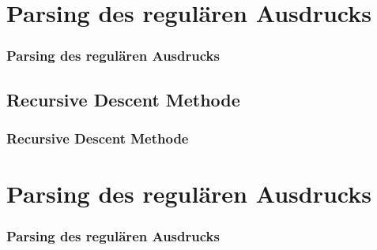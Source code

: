\documentclass[ignorenonframetext]{beamer}
\begin{document}
\section{Parsing des regulären Ausdrucks}

\begin{frame}
    \frametitle{Parsing des regulären Ausdrucks}

\end{frame}


\subsection{Recursive Descent Methode}
\begin{frame}
    \frametitle{Recursive Descent Methode}

\end{frame}



\section{Parsing des regulären Ausdrucks}

\begin{frame}
    \frametitle{Parsing des regulären Ausdrucks}

\end{frame}
\end{document}
